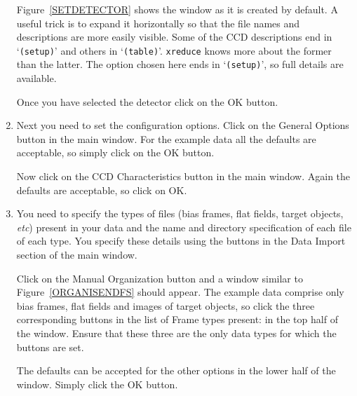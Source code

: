 \documentclass[twoside,11pt]{article}
\begin{document}
\begin{enumerate}
   Figure~\ref{SETDETECTOR} shows the window as it is created by default.
   A useful trick is to expand it horizontally so that the file names and
   descriptions are more easily visible.  Some of the CCD descriptions
   end in `{\tt (setup)}' and others in `{\tt (table)}'.  {\tt xreduce}
   knows more about the former than the latter.  The option chosen here
   ends in `{\tt (setup)}', so full details are available.

   Once you have selected the detector click on the {\sf OK} button.

  \item Next you need to set the configuration options.  Click on the
   {\sf General Options} button in the main window.  For the example
   data all the defaults are acceptable, so simply click on the {\sf OK}
   button.

   Now click on the {\sf CCD Characteristics} button in the main window.
   Again the defaults are acceptable, so click on {\sf OK}.

  \item You need to specify the types of files (bias frames, flat fields,
   target objects, \emph{etc}) present in your data and the name and
   directory specification of each file of each type.  You specify these
   details using the buttons in the {\sf Data Import} section of the
   main window.

   Click on the {\sf Manual Organization} button and a window similar to
   Figure~\ref{ORGANISENDFS} should appear.  The example data comprise
   only bias frames, flat fields and images of target objects, so click
   the three corresponding buttons in the list of {\sf Frame types
   present:} in the top half of the window.  Ensure that these three
   are the only data types for which the buttons are set.

   The defaults can be accepted for the other options in the lower half
   of the window.  Simply click the {\sf OK} button.


\end{enumerate}
\end{document}
